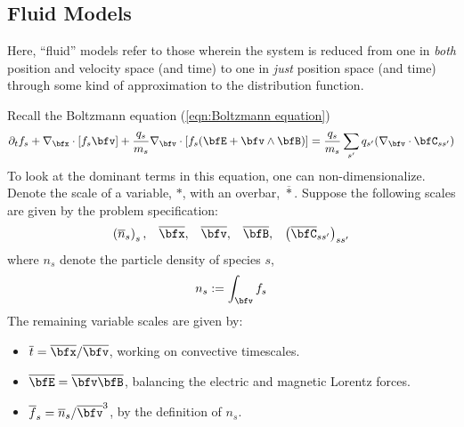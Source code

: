 \subsection*{Fluid Models}
    \line

    \begin{definition}
        Here, ``fluid'' models refer to those wherein the system is reduced from one in \emph{both} position and velocity space (and time) to one in \emph{just} position space (and time) through some kind of approximation to the distribution function.
    \end{definition}
    
    \line
    
    Recall the Boltzmann equation (\ref{eqn:Boltzmann equation})
    \begin{equation*}
        \partial_{t}f_{s} + \nabla_{\bfx}\cdot[f_{s}\bfv] + \frac{q_{s}}{m_{s}}\nabla_{\bfv}\cdot[f_{s}(\bfE + \bfv\wedge\bfB)]  =  \frac{q_{s}}{m_{s}}\sum_{s'}q_{s'}(\nabla_{\bfv}\cdot\bfC_{ss'})
    \end{equation*}
    To look at the dominant terms in this equation, one can non-dimensionalize. Denote the scale of a variable, $*$, with an overbar, $\overline{*}$. Suppose the following scales are given by the problem specification:
    \begin{align}
        \left(\overline{n}_{s}\right)_{s},        &&
        \overline{\bfx},                          &&
        \overline{\bfv},                          &&
        \overline{\bfB},                          &&
        \left(\overline{\bfC}_{ss'}\right)_{ss'}
    \end{align}
    where $n_{s}$ denote the particle density of species $s$,
    \begin{equation}
        n_{s}  :=  \int_{\bfv}f_{s}
    \end{equation}
    The remaining variable scales are given by:
    \begin{itemize}
        \item  $\overline{t}      =  \overline{\bfx}/\overline{\bfv}$, working on convective timescales.
        \item  $\overline{\bfE}   =  \overline{\bfv}\overline{\bfB}$, balancing the electric and magnetic Lorentz forces. 
        \item  $\overline{f}_{s}  =  \overline{n}_{s}/\overline{\bfv}^{3}$, by the definition of $n_{s}$.
    \end{itemize}
    
